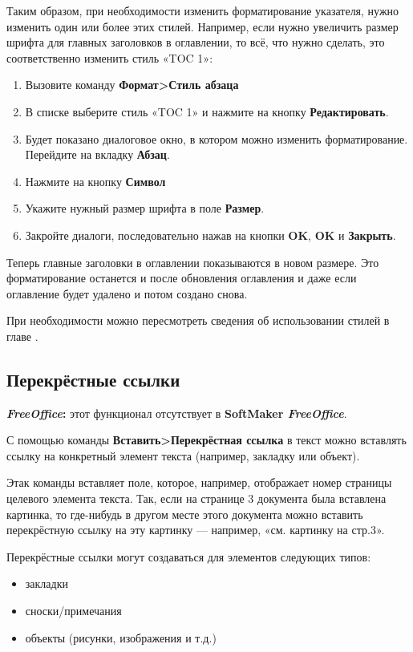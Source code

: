 ﻿\documentclass[a4paper,10pt]{article}
\begin{document}
Таким образом, при необходимости изменить форматирование указателя, нужно изменить один или более этих стилей. Например, если нужно увеличить размер шрифта для главных заголовков в оглавлении, то всё, что нужно сделать, это соответственно изменить стиль «TOC 1»:
\begin{enumerate}
 \item Вызовите команду \textbf{Формат>Стиль абзаца}
 \item В списке выберите стиль «TOC 1» и нажмите на кнопку \textbf{Редактировать}.
 \item Будет показано диалоговое окно, в котором можно изменить форматирование. Перейдите на вкладку \textbf{Абзац}.
 \item Нажмите на кнопку \textbf{Символ}
 \item Укажите нужный размер шрифта в поле \textbf{Размер}.
 \item Закройте диалоги, последовательно нажав на кнопки \textbf{OK}, \textbf{OK} и \textbf{Закрыть}.
\end{enumerate}

Теперь главные заголовки в оглавлении показываются в новом размере. Это форматирование останется и после обновления оглавления и даже если оглавление будет удалено и потом создано снова.

При необходимости можно пересмотреть сведения об использовании стилей в главе .

\subsection{Перекрёстные ссылки}
\begin{mdframed}[backgroundcolor=pink!50]
\textbf{\textit{FreeOffice}:} этот функционал отсутствует в \textbf{SoftMaker \textit{FreeOffice}}.
\end{mdframed}

С помощью команды \textbf{Вставить>Перекрёстная ссылка} в текст можно вставлять ссылку на конкретный элемент текста (например, закладку или объект).

Этак команды вставляет поле, которое, например, отображает номер страницы целевого элемента текста. Так, если на странице 3 документа была вставлена картинка, то где-нибудь в другом месте этого документа можно вставить перекрёстную ссылку на эту картинку — например, «см. картинку на стр.3».

Перекрёстные ссылки могут создаваться для элементов следующих типов:
\begin{itemize}
 \item закладки
 \item сноски/примечания
 \item объекты (рисунки, изображения и т.д.)
\end{itemize}
\end{document}
